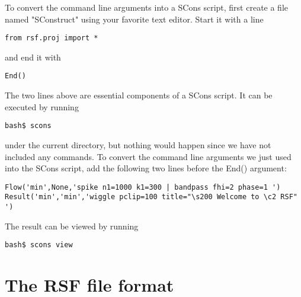 To convert the command line arguments into a SCons script, first
create a file named "SConstruct" using your favorite text
editor. Start it with a line
\begin{verbatim}
from rsf.proj import *
\end{verbatim}
and end it with
\begin{verbatim}
End() 
\end{verbatim}
The two lines above are essential components of a SCons script. It can
be executed by running
\begin{verbatim}
bash$ scons
\end{verbatim}
under the current directory, but nothing would happen since we have
not included any commands. To convert the command line arguments we
just used into the SCons script, add the following two lines before the
End() argument:
\begin{verbatim}
Flow('min',None,'spike n1=1000 k1=300 | bandpass fhi=2 phase=1 ')
Result('min','min','wiggle pclip=100 title="\s200 Welcome to \c2 RSF" ')
\end{verbatim}
The result can be viewed by running
\begin{verbatim}
bash$ scons view
\end{verbatim}

\section{The RSF file format}

